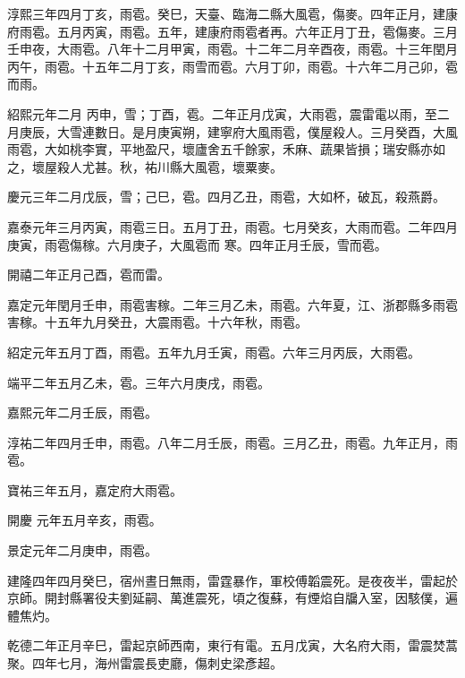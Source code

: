\begin{pinyinscope}
 淳熙三年四月丁亥，雨雹。癸巳，天臺、臨海二縣大風雹，傷麥。四年正月，建康府雨雹。五月丙寅，雨雹。五年，建康府雨雹者再。六年正月丁丑，雹傷麥。三月壬申夜，大雨雹。八年十二月甲寅，雨雹。十二年二月辛酉夜，雨雹。十三年閏月丙午，雨雹。十五年二月丁亥，雨雪而雹。六月丁卯，雨雹。十六年二月己卯，雹而雨。



 紹熙元年二月
 丙申，雪；丁酉，雹。二年正月戊寅，大雨雹，震雷電以雨，至二月庚辰，大雪連數日。是月庚寅朔，建寧府大風雨雹，僕屋殺人。三月癸酉，大風雨雹，大如桃李實，平地盈尺，壞廬舍五千餘家，禾麻、蔬果皆損；瑞安縣亦如之，壞屋殺人尤甚。秋，祐川縣大風雹，壞粟麥。



 慶元三年二月戊辰，雪；己巳，雹。四月乙丑，雨雹，大如杯，破瓦，殺燕爵。



 嘉泰元年三月丙寅，雨雹三日。五月丁丑，雨雹。七月癸亥，大雨而雹。二年四月庚寅，雨雹傷稼。六月庚子，大風雹而
 寒。四年正月壬辰，雪而雹。



 開禧二年正月己酉，雹而雷。



 嘉定元年閏月壬申，雨雹害稼。二年三月乙未，雨雹。六年夏，江、浙郡縣多雨雹害稼。十五年九月癸丑，大震雨雹。十六年秋，雨雹。



 紹定元年五月丁酉，雨雹。五年九月壬寅，雨雹。六年三月丙辰，大雨雹。



 端平二年五月乙未，雹。三年六月庚戌，雨雹。



 嘉熙元年二月壬辰，雨雹。



 淳祐二年四月壬申，雨雹。八年二月壬辰，雨雹。三月乙丑，雨雹。九年正月，雨雹。



 寶祐三年五月，嘉定府大雨雹。



 開慶
 元年五月辛亥，雨雹。



 景定元年二月庚申，雨雹。



 建隆四年四月癸巳，宿州晝日無雨，雷霆暴作，軍校傅韜震死。是夜夜半，雷起於京師。開封縣署役夫劉延嗣、萬進震死，頃之復蘇，有煙焰自牖入室，因駭僕，遍體焦灼。



 乾德二年正月辛巳，雷起京師西南，東行有電。五月戊寅，大名府大雨，雷震焚蒿聚。四年七月，海州雷震長吏廳，傷刺史梁彥超。




\end{pinyinscope}
